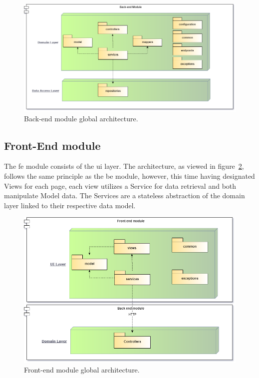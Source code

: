 \begin{figure}[H]
    \centering
    \includegraphics[scale=0.4]{Chapters/img/architecture/domain-dal-arch.drawio.png}
    \caption{Back-end module global architecture.}
    \label{fig:domain-arch}
\end{figure}

\subsection{Front-End module}
The \acrshort{fe} module consists of the \acrshort{ui} layer. The architecture, as viewed in figure~\ref{fig:ui-arch}, follows the same principle as the \acrshort{be} module, however, this time having designated Views for each page, each view utilizes a Service for data retrieval and both manipulate Model data. The Services are a stateless abstraction of the domain layer linked to their respective data model.

\begin{figure}[H]
    \centering
    \includegraphics[scale=0.5]{Chapters/img/architecture/ui-domain-arch.png}
    \caption{Front-end module global architecture.}
    \label{fig:ui-arch}
\end{figure}


